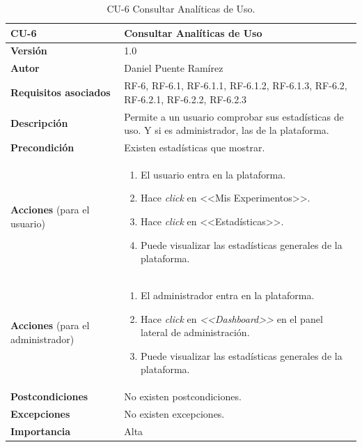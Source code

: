\begin{table}[p]
\centering
\begin{tabularx}{\linewidth}{ p{} p{} }
\toprule
\textbf{CU-6} & \textbf{Consultar Analíticas de Uso}\\
\toprule
\textbf{Versión} & 1.0\\
\textbf{Autor} & Daniel Puente Ramírez\\
\textbf{Requisitos asociados} & RF-6, RF-6.1, RF-6.1.1, RF-6.1.2, RF-6.1.3, RF-6.2, RF-6.2.1, RF-6.2.2, RF-6.2.3\\
\textbf{Descripción} & Permite a un usuario comprobar sus estadísticas de uso. Y si es administrador, las de la plataforma.\\
\textbf{Precondición} & Existen estadísticas que mostrar.\\
\textbf{Acciones} (para el usuario) &
\begin{enumerate}
\def\labelenumi{\arabic{enumi}.}
\tightlist
\item El usuario entra en la plataforma.
\item Hace \textit{click} en <<Mis Experimentos>>.
\item Hace \textit{click} en <<Estadísticas>>.
\item Puede visualizar las estadísticas generales de la plataforma.
\end{enumerate}\\
\textbf{Acciones} (para el administrador) &
\begin{enumerate}
\def\labelenumi{\arabic{enumi}.}
\tightlist
\item El administrador entra en la plataforma.
\item Hace \textit{click} en \textit{<<Dashboard>>} en el panel lateral de administración.
\item Puede visualizar las estadísticas generales de la plataforma.
\end{enumerate}\\
\textbf{Postcondiciones} & No existen postcondiciones.\\
\textbf{Excepciones} & No existen excepciones.\\
\textbf{Importancia} & Alta \\
\bottomrule
\end{tabularx}
\caption{CU-6 Consultar Analíticas de Uso.}
\end{table}

